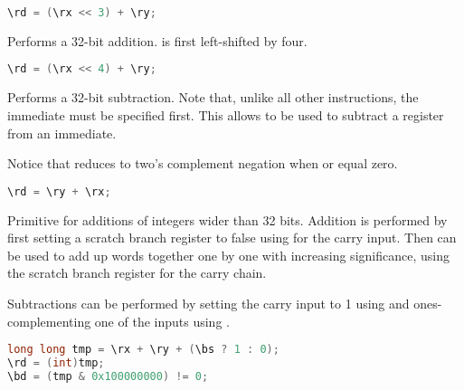 \begin{lstlisting}[numbers=none, basicstyle=\ttfamily\footnotesize, language=C++]
\rd = (\rx << 3) + \ry;
\end{lstlisting}

Performs a 32-bit addition. \code{\rx} is first left-shifted by four.

\begin{lstlisting}[numbers=none, basicstyle=\ttfamily\footnotesize, language=C++]
\rd = (\rx << 4) + \ry;
\end{lstlisting}

Performs a 32-bit subtraction. Note that, unlike all other instructions, the
immediate must be specified first. This allows  to be used to subtract
a register from an immediate.

Notice that  reduces to two's complement negation when  or
 equal zero.

\begin{lstlisting}[numbers=none, basicstyle=\ttfamily\footnotesize, language=C++]
\rd = \ry + \rx;
\end{lstlisting}

Primitive for additions of integers wider than 32 bits. Addition is performed by 
first setting a scratch branch register to false using  for the 
carry input. Then  can be used to add up words together one by one 
with increasing significance, using the scratch branch register for the carry 
chain.

Subtractions can be performed by setting the carry input to 1 using  
and ones-complementing one of the inputs using .

\begin{lstlisting}[numbers=none, basicstyle=\ttfamily\footnotesize, language=C++]
long long tmp = \rx + \ry + (\bs ? 1 : 0);
\rd = (int)tmp;
\bd = (tmp & 0x100000000) != 0;
\end{lstlisting}


